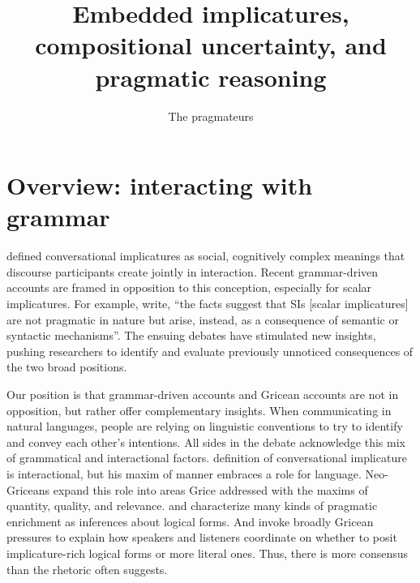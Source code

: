 \documentclass[leqno]{article}
\begin{document}

\title{Embedded implicatures, compositional uncertainty, and pragmatic reasoning}
\author{The pragmateurs}
\maketitle



\section{Overview: interacting with grammar}\label{sec:introduction}

\citet{Grice75} defined conversational implicatures as social,
cognitively complex meanings that discourse participants create
jointly in interaction. Recent grammar-driven accounts are framed in
opposition to this conception, especially for scalar implicatures.
For example,  write, ``the facts
suggest that SIs [scalar implicatures] are not pragmatic in nature but
arise, instead, as a consequence of semantic or syntactic
mechanisms''. The ensuing debates have stimulated new insights,
pushing researchers to identify and evaluate previously unnoticed
consequences of the two broad positions.

Our position is that grammar-driven accounts and Gricean accounts are
not in opposition, but rather offer complementary insights.  When
communicating in natural languages, people are relying on linguistic
conventions to try to identify and convey each other's intentions. All
sides in the debate acknowledge this mix of grammatical and
interactional factors.  definition of
conversational implicature is interactional, but his maxim of manner
embraces a role for language. Neo-Griceans expand this role into areas
Grice addressed with the maxims of quantity, quality, and
relevance. \citet{Sperber95} and \citet{Bach94} characterize many
kinds of pragmatic enrichment as inferences about logical forms. And
\citet{ChierchiaFoxSpector08} invoke broadly Gricean pressures to
explain how speakers and listeners coordinate on whether to posit
implicature-rich logical forms or more literal ones. Thus, there is
more consensus than the rhetoric often suggests.
\end{document}
